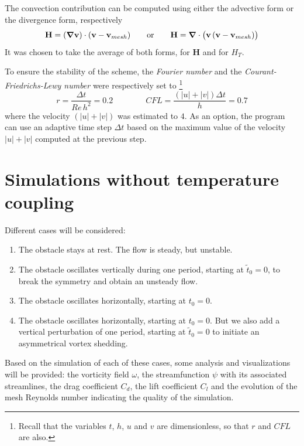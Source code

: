 \documentclass[11 pt]{article}
\begin{document}
The convection contribution can be computed using either the advective form or the divergence form, respectively
\begin{equation}
    \mathbf{H} = (\boldsymbol\nabla \mathbf{v}) \cdot (\mathbf{v} - \mathbf{v}_{mesh}) \qquad \text{or} \qquad \mathbf{H} = \boldsymbol\nabla \cdot \big(\mathbf{v} \, (\mathbf{v} - \mathbf{v}_{mesh}) \big)
\end{equation}
It was chosen to take the average of both forms, for $\mathbf{H}$ and for $H_T$.

To ensure the stability of the scheme, the \textit{Fourier number} and the \textit{Courant-Friedrichs-Lewy number} were respectively set to \footnote{Recall that the variables $t$, $h$, $u$ and $v$ are dimensionless, so that $r$ and $CFL$ are also.}
\begin{equation}
    r = \frac{\Delta t}{Re \, h^2} = 0.2 \qquad\qquad CFL = \frac{(|u|+|v|) \Delta t}{h} = 0.7
\end{equation}
where the velocity $(|u|+|v|)$ was estimated to $4$. As an option, the program can use an adaptive time step $\Delta t$ based on the maximum value of the velocity $|u|+|v|$ computed at the previous step.


\section{Simulations without temperature coupling}
Different cases will be considered:
\begin{enumerate}[topsep=0pt]
    \setlength\itemsep{0pt}
    \item The obstacle stays at rest. The flow is steady, but unstable.
    \item The obstacle oscillates vertically during one period, starting at $\tilde t_0 = 0$, to break the symmetry and obtain an unsteady flow.
    \item The obstacle oscillates horizontally, starting at $t_0=0$.
    \item The obstacle oscillates horizontally, starting at $t_0=0$. But we also add a vertical perturbation of one period, starting at $\tilde t_0=0$ to initiate an asymmetrical vortex shedding.
\end{enumerate}

Based on the simulation of each of these cases, some analysis and visualizations will be provided: the vorticity field $\omega$, the streamfunction $\psi$ with its associated streamlines, the drag coefficient $C_d$, the lift coefficient $C_l$ and the evolution of the mesh Reynolds number indicating the quality of the simulation.
\end{document}
